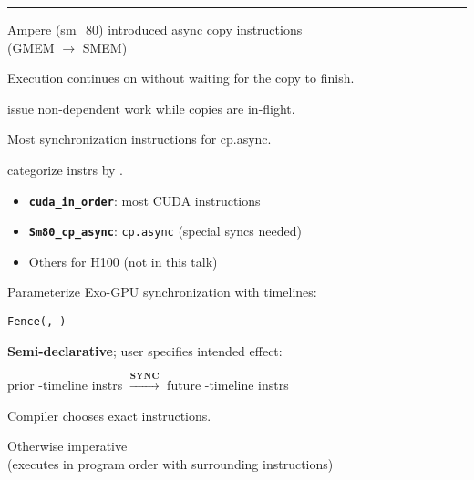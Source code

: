 \vfill
\hrule
\vfill

\begin{center}
\Large
\begin{tikzpicture}[node distance=0mm]

\end{tikzpicture}
\end{center}


\newpage
{}

{\LARGE
Ampere (sm\_80) introduced async copy instructions\\
(GMEM $\to$ SMEM)

Execution continues on without waiting for the copy to finish.

}

{\Large

}

{\LARGE
{} issue non-dependent  work while copies are in-flight.
}

\newpage
{}

{\LARGE
Most synchronization instructions  for cp.async.

 categorize instrs by .

\begin{itemize}
  \item \textbf{\texttt{cuda\_in\_order}}: most CUDA instructions
  \item \textbf{\texttt{Sm80\_cp\_async}}: \texttt{cp.async} (special syncs needed)
  \item Others for H100 (not in this talk)
\end{itemize}

}

\newpage
{}

{\LARGE
Parameterize Exo-GPU synchronization with timelines:

\begin{center}
  \texttt{Fence(, )}
\end{center}

\textbf{Semi-declarative}; user specifies intended effect:

\begin{center}
prior -timeline instrs $\xrightarrow{\textbf{SYNC}}$ future -timeline instrs
\end{center}

Compiler chooses exact instructions.

Otherwise imperative\\(executes in program order with surrounding instructions)

}

